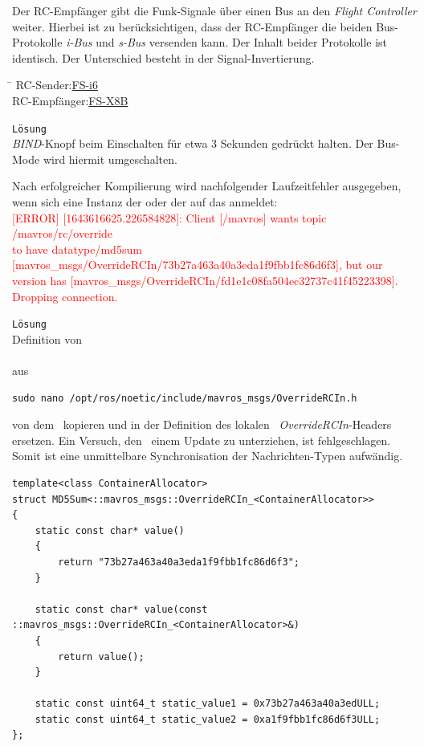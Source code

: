 Der RC-Empfänger gibt die Funk-Signale über einen Bus an den \textit{Flight Controller} weiter. Hierbei ist zu berücksichtigen, dass der RC-Empfänger die beiden  Bus-Protokolle \textit{i-Bus} und \textit{s-Bus} versenden kann. Der Inhalt beider Protokolle ist identisch. Der Unterschied besteht in der Signal-Invertierung.\\
\begin{tabbing}
\hspace{3.5cm} \= \kill
RC-Sender:\>\href{https://www.flysky-cn.com/i6-gaishu}{FS-i6}\\
RC-Empfänger:\>\href{https://www.flysky-cn.com/x8b-canshu}{FS-X8B}
\end{tabbing}

\texttt{Lösung}\\
\textit{BIND}-Knopf beim Einschalten für etwa 3 Sekunden gedrückt halten. Der Bus-Mode wird hiermit umgeschalten.


Nach erfolgreicher Kompilierung wird nachfolgender Laufzeitfehler ausgegeben, wenn sich eine Instanz der  oder der  auf das  anmeldet:\\
\textcolor{red}{[ERROR] [1643616625.226584828]: Client [/mavros] wants topic /mavros/rc/override \\to have datatype/md5sum [mavros\_msgs/OverrideRCIn/73b27a463a40a3eda1f9fbb1fc86d6f3], but our version has [mavros\_msgs/OverrideRCIn/fd1e1c08fa504ec32737c41f45223398]. Dropping connection.}

\texttt{Lösung}\\
Definition von \\ \\aus 
\begin{lstlisting}[style=Style_Bash, caption=Befehl zum Öffnen des \textit{OverrideRCIn}-Headers]
sudo nano /opt/ros/noetic/include/mavros_msgs/OverrideRCIn.h
\end{lstlisting}
von dem \Pie\ kopieren und in der Definition des lokalen \ROS\ \textit{\mbox{OverrideRCIn}}-Headers ersetzen.
Ein Versuch, den \Pie\ einem Update zu unterziehen, ist fehlgeschlagen. Somit ist eine unmittelbare Synchronisation der Nachrichten-Typen aufwändig.

\begin{lstlisting}[style=Style_CPP, numbers=none, caption=Definition des Struct \CodeStruct{MD5Sum} für das Template \textit{OverrideRCIn}]
template<class ContainerAllocator>
struct MD5Sum<::mavros_msgs::OverrideRCIn_<ContainerAllocator>>
{
	static const char* value()
	{
		return "73b27a463a40a3eda1f9fbb1fc86d6f3";
	}

	static const char* value(const ::mavros_msgs::OverrideRCIn_<ContainerAllocator>&)
	{
		return value();
	}
	
	static const uint64_t static_value1 = 0x73b27a463a40a3edULL;
	static const uint64_t static_value2 = 0xa1f9fbb1fc86d6f3ULL;
};
\end{lstlisting}



